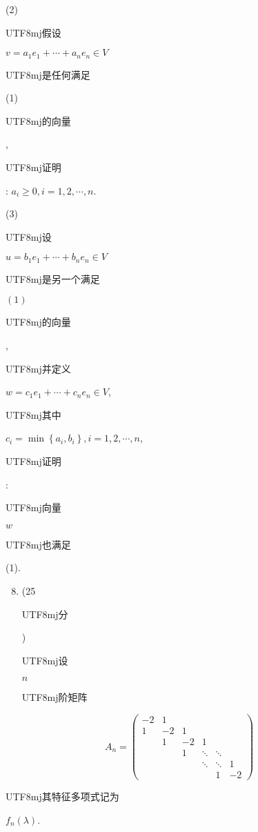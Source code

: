 \documentclass[10pt]{article}
\begin{document}
(2) \begin{CJK}{UTF8}{mj}假设\end{CJK} $v=a_{1} e_{1}+\cdots+a_{n} e_{n} \in V$ \begin{CJK}{UTF8}{mj}是任何满足\end{CJK} (1) \begin{CJK}{UTF8}{mj}的向量\end{CJK}, \begin{CJK}{UTF8}{mj}证明\end{CJK}: $a_{i} \geq 0, i=1,2, \cdots, n$.

(3) \begin{CJK}{UTF8}{mj}设\end{CJK} $u=b_{1} e_{1}+\cdots+b_{n} e_{n} \in V$ \begin{CJK}{UTF8}{mj}是另一个满足\end{CJK} $(1)$ \begin{CJK}{UTF8}{mj}的向量\end{CJK}, \begin{CJK}{UTF8}{mj}并定义\end{CJK} $w=c_{1} e_{1}+\cdots+c_{n} e_{n} \in V$, \begin{CJK}{UTF8}{mj}其中\end{CJK} $c_{i}=\min \left\{a_{i}, b_{i}\right\}, i=1,2, \cdots, n$, \begin{CJK}{UTF8}{mj}证明\end{CJK}: \begin{CJK}{UTF8}{mj}向量\end{CJK} $w$ \begin{CJK}{UTF8}{mj}也满足\end{CJK} (1).

\begin{enumerate}
  \setcounter{enumi}{7}
  \item (25 \begin{CJK}{UTF8}{mj}分\end{CJK}) \begin{CJK}{UTF8}{mj}设\end{CJK} $n$ \begin{CJK}{UTF8}{mj}阶矩阵\end{CJK}
\end{enumerate}
$$
A_{n}=\left(\begin{array}{cccccc}
-2 & 1 & & & & \\
1 & -2 & 1 & & & \\
& 1 & -2 & 1 & & \\
& & 1 & \ddots & \ddots & \\
& & & \ddots & \ddots & 1 \\
& & & & 1 & -2
\end{array}\right)
$$
\begin{CJK}{UTF8}{mj}其特征多项式记为\end{CJK} $f_{n}(\lambda)$.
\end{document}
